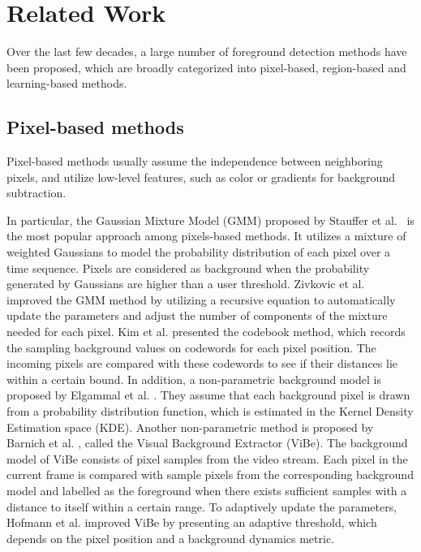 \documentclass[journal]{IEEEtran}
\begin{document}
\section{Related Work}
\label{sec2}
Over the last few decades, a large number of foreground detection methods have been proposed,
which are broadly categorized into pixel-based, region-based and learning-based methods.
\subsection{Pixel-based methods}
Pixel-based methods usually assume the independence between neighboring pixels,
and utilize low-level features, such as color or gradients for background subtraction.

In particular, the Gaussian Mixture Model (GMM) proposed by Stauffer et al.\ \cite{Stauffer1999} is the most popular approach among pixels-based methods\cite{Goyal2018}.
It utilizes a mixture of weighted Gaussians to model the probability distribution of each pixel over a time sequence.
%
Pixels are considered as background when the probability generated by Gaussians are higher than a user threshold.
Zivkovic et al.\ \cite{Zivkovic2004} improved the GMM method by utilizing a recursive equation
to automatically update the parameters and adjust the number of components of the mixture needed for each pixel. 
%
Kim et al.\cite{Kim2005} presented the codebook method, which records the sampling background values on codewords for each pixel position.
The incoming pixels are compared with these codewords to see if their distances lie within a certain bound. 
In addition, a non-parametric background model is proposed by Elgammal et al. \cite{Elgammal2000Non}. 
They assume that each background pixel is drawn from a probability distribution function, which is estimated in the Kernel Density Estimation space (KDE). 
Another non-parametric method is proposed by Barnich et al. \cite{Barnich2011_2011_TIP}, called the Visual Background Extractor (ViBe). 
%
The background model of ViBe consists of pixel samples from the video stream. 
%
Each pixel in the current frame is compared with sample pixels from the corresponding background model and labelled as the foreground when there exists sufficient samples with a distance to itself within a certain range. 
To adaptively update the parameters, Hofmann et al.\cite{Hofmann2012Background} improved ViBe by presenting an adaptive threshold, 
which depends on the pixel position and a background dynamics metric.
\end{document}
